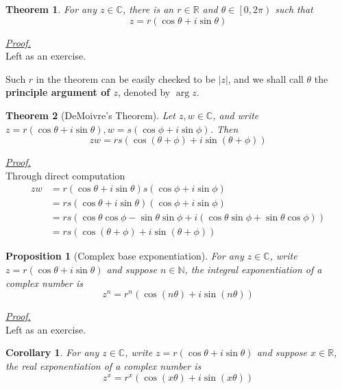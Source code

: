 \documentclass[12pt]{article}
\newtheorem*{theorem}{Theorem}
\newtheorem*{corollary}{Corollary}
\newtheorem*{proposition}{Proposition}
\renewenvironment{proof}[1][Proof]{\begin{snugshade*} \underline{\textit{{#1}.}}\\}{\hfill \qedsymbol \end{snugshade*}}
\begin{document}
    \begin{theorem}
        For any $z\in\mathbb{C}$, there is an $r\in\mathbb{R}$ and $\theta \in \left[0,2\pi\right)$ such that $$z=r(\cos{\theta}+i\sin{\theta})$$
    \end{theorem}

    \begin{proof}
        Left as an exercise.
    \end{proof}

    Such $r$ in the theorem can be easily checked to be $|z|$, and we shall call $\theta$ the \textbf{principle argument of $z$}, denoted by $\arg{z}$.

    \begin{theorem}[DeMoivre's Theorem]
        Let $z,w\in\mathbb{C}$, and write $z=r(\cos{\theta}+i\sin{\theta}),w=s(\cos{\phi}+i\sin{\phi})$. Then $$zw=rs(\cos(\theta+\phi)+i\sin(\theta+\phi))$$
    \end{theorem}

    \begin{proof}
        Through direct computation\begin{align*}
            zw&=r(\cos{\theta}+i\sin{\theta})s(\cos{\phi}+i\sin{\phi})\\
            &=rs(\cos{\theta}+i\sin{\theta})(\cos{\phi}+i\sin{\phi})\\
            &=rs(\cos{\theta}\cos{\phi}-\sin{\theta}\sin{\phi}+i(\cos{\theta}\sin{\phi}+\sin{\theta}\cos{\phi}))\\
            &=rs(\cos(\theta+\phi)+i\sin(\theta+\phi))
        \end{align*}
    \end{proof}

    \begin{proposition}[Complex base exponentiation]
        For any $z\in\mathbb{C}$, write $z=r(\cos{\theta}+i\sin{\theta})$ and suppose $n\in\mathbb{N}$, the integral exponentiation of a complex number is $$z^n=r^n(\cos(n\theta)+i\sin(n\theta))$$
    \end{proposition}

    \begin{proof}
        Left as an exercise.
    \end{proof}

    \begin{corollary}
        For any $z\in\mathbb{C}$, write $z=r(\cos{\theta}+i\sin{\theta})$ and suppose $x\in\mathbb{R}$, the real exponentiation of a complex number is $$z^x=r^x(\cos(x\theta)+i\sin(x\theta))$$
    \end{corollary}
\end{document}
